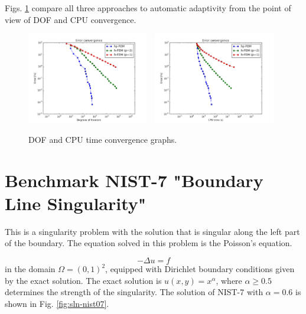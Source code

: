 \documentclass[12pt]{elsarticle}
\begin{document}
Figs. \ref{fig:nist-6-conv} compare all
three approaches to automatic adaptivity from the point
of view of DOF and CPU convergence.

\begin{figure}[H]
\centering
\includegraphics[height=4cm]{nist/nist-6/conv_dof_aniso.png}\ \
\includegraphics[height=4cm]{nist/nist-6/conv_cpu_aniso.png}
\caption{DOF and CPU time convergence graphs.}
\vspace{-5mm}
\label{fig:nist-6-conv}
\end{figure}


\section{Benchmark NIST-7 "Boundary Line Singularity"}
\label{sec:bench-7}

This is a singularity problem with the solution that is singular along the left part of the boundary.
The equation solved in this problem is the Poisson's equation.

\begin{equation} \label{boundary-line-singularity}
-\Delta u = f
\end{equation}
in the domain $\Omega = (0, 1)^2$, equipped with Dirichlet boundary conditions
given by the exact solution. The exact solution is
$u(x,y) = x^{\alpha}$,
where $\alpha \geq 0.5$ determines the strength of the singularity.
The solution of NIST-7 with $\alpha = 0.6$ is shown in Fig. \ref{fig:sln-nist07}.
\end{document}
